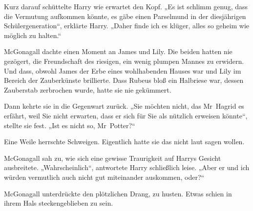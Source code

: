 Kurz darauf schüttelte Harry wie erwartet den Kopf.
„Es ist schlimm genug, dass die Vermutung aufkommen könnte, es gäbe einen Parselmund in der diesjährigen Schülergeneration“, erklärte Harry.
„Daher finde ich es klüger, alles so geheim wie möglich zu halten.“

McGonagall dachte einen Moment an James und Lily. Die beiden hatten nie gezögert, die Freundschaft des riesigen, ein wenig plumpen Mannes zu erwidern. Und dass, obwohl James der Erbe eines wohlhabenden Hauses war und Lily im Bereich der Zauberkünste brillierte. Dass Rubeus bloß ein Halbriese war, dessen Zauberstab zerbrochen wurde, hatte sie nie gekümmert.

Dann kehrte sie in die Gegenwart zurück.
„Sie möchten nicht, das Mr~Hagrid es erfährt, weil Sie nicht erwarten, dass er sich für Sie als nützlich erweisen könnte“, stellte sie fest.
„Ist es nicht so, Mr~Potter?“

Eine Weile herrschte Schweigen. Eigentlich hatte sie das nicht laut sagen wollen.

McGonagall sah zu, wie sich eine gewisse Traurigkeit auf Harrys Gesicht ausbreitete.
„Wahrscheinlich“, antwortete Harry schließlich leise.
„Aber er und ich würden vermutlich auch nicht gut miteinander auskommen, oder?“

McGonagall unterdrückte den plötzlichen Drang, zu husten. Etwas schien in ihrem Hals steckengeblieben zu sein.

